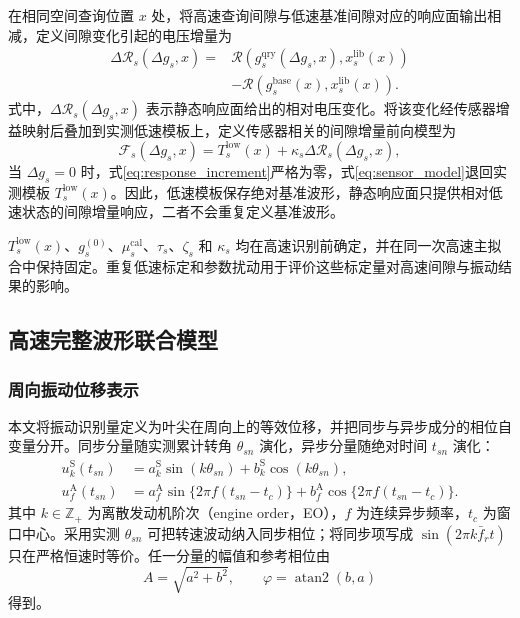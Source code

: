 \documentclass[UTF8,12pt,a4paper]{ctexart}
\newcommand{\Rcal}{\mathcal{R}}
\newcommand{\Fsen}{\mathcal{F}}
\begin{document}
在相同空间查询位置 $x$ 处，将高速查询间隙与低速基准间隙对应的响应面输出相减，定义间隙变化引起的电压增量为
\begin{align}
\Delta\Rcal_s(\Delta g_s,x)
={}&\Rcal\!\left(
g_s^{\mathrm{qry}}(\Delta g_s,x),
x_s^{\mathrm{lib}}(x)
\right)
\nonumber\\
&-\Rcal\!\left(
g_s^{\mathrm{base}}(x),
x_s^{\mathrm{lib}}(x)
\right).
\label{eq:response_increment}
\end{align}
式中，$\Delta\Rcal_s(\Delta g_s,x)$ 表示静态响应面给出的相对电压变化。将该变化经传感器增益映射后叠加到实测低速模板上，定义传感器相关的间隙增量前向模型为
\begin{equation}
\Fsen_s(\Delta g_s,x)
=T_s^{\mathrm{low}}(x)
+\kappa_s\Delta\Rcal_s(\Delta g_s,x),
\label{eq:sensor_model}
\end{equation}
当 $\Delta g_s=0$ 时，式\eqref{eq:response_increment}严格为零，式\eqref{eq:sensor_model}退回实测模板 $T_s^{\mathrm{low}}(x)$。因此，低速模板保存绝对基准波形，静态响应面只提供相对低速状态的间隙增量响应，二者不会重复定义基准波形。

$T_s^{\mathrm{low}}(x)$、$g_s^{(0)}$、$\mu_s^{\mathrm{cal}}$、$\tau_s$、$\zeta_s$ 和 $\kappa_s$ 均在高速识别前确定，并在同一次高速主拟合中保持固定。重复低速标定和参数扰动用于评价这些标定量对高速间隙与振动结果的影响。

\subsection{高速完整波形联合模型}

\subsubsection{周向振动位移表示}

本文将振动识别量定义为叶尖在周向上的等效位移，并把同步与异步成分的相位自变量分开。同步分量随实测累计转角 $\theta_{sn}$ 演化，异步分量随绝对时间 $t_{sn}$ 演化：
\begin{align}
u_k^{\mathrm S}(t_{sn})
&=a_k^{\mathrm S}\sin(k\theta_{sn})+b_k^{\mathrm S}\cos(k\theta_{sn}),\\
u_f^{\mathrm A}(t_{sn})
&=a_f^{\mathrm A}\sin\{2\pi f(t_{sn}-t_c)\}
+b_f^{\mathrm A}\cos\{2\pi f(t_{sn}-t_c)\}.
\label{eq:vibration}
\end{align}
其中 $k\in\mathbb Z_+$ 为离散发动机阶次（engine order，EO），$f$ 为连续异步频率，$t_c$ 为窗口中心。采用实测 $\theta_{sn}$ 可把转速波动纳入同步相位；将同步项写成 $\sin(2\pi k\bar f_rt)$ 只在严格恒速时等价。任一分量的幅值和参考相位由
\begin{equation}
A=\sqrt{a^2+b^2},
\qquad
\varphi=\operatorname{atan2}(b,a)
\label{eq:amp_phase}
\end{equation}
得到。
\end{document}
